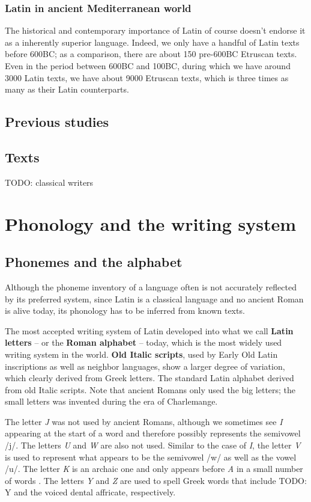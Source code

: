\documentclass[a4paper, oneside, 12pt]{report}
\newcommand*{\citechap}[1]{chap.~{#1}}
\newcommand*{\concept}[1]{\textbf{#1}}
\newcommand{\form}[1]{\emph{#1}}
\begin{document}
\subsection{Latin in ancient Mediterranean world}

The historical and contemporary importance of Latin 
of course doesn't endorse it as a inherently superior language. 
Indeed, we only have a handful of Latin texts before 600BC; 
as a comparison, there are about 150 pre-600BC Etruscan texts.
Even in the period between 600BC and 100BC, 
during which we have around 3000 Latin texts,
we have about 9000 Etruscan texts, 
which is three times as many as their Latin counterparts. 


\section{Previous studies}


\section{Texts}

TODO: classical writers

\chapter{Phonology and the writing system}

\section{Phonemes and the alphabet}

Although the phoneme inventory of a language 
often is not accurately reflected by its preferred system, 
since Latin is a classical language 
and no ancient Roman is alive today, 
its phonology has to be inferred from known texts. 

The most accepted writing system of Latin developed into 
what we call \concept{Latin letters} -- or the \concept{Roman alphabet} -- today, 
which is the most widely used writing system in the world.
\concept{Old Italic scripts},
used by Early Old Latin inscriptions 
as well as neighbor languages,
show a larger degree of variation, 
which clearly derived from Greek letters.
The standard Latin alphabet derived from old Italic scripts.
Note that ancient Romans only used the big letters;
the small letters was invented during the era of Charlemange.

The letter \form{J} was not used by ancient Romans, 
although we sometimes see \form{I} appearing at the start of a word 
and therefore possibly represents the semivowel /j/.
The letters \form{U} and \form{W} are also not used.
Similar to the case of \form{I},
the letter \form{V} is used to represent 
what appears to be the semivowel /w/ 
as well as the vowel /u/. 
The letter \form{K} is an archaic one 
and only appears before \form{A} in a small number of words
\citep[\citechap{2}]{oniga2014latin}.
The letters \form{Y} and \form{Z} are used to spell Greek words that 
include TODO: Y and the voiced dental affricate, respectively.
\end{document}
